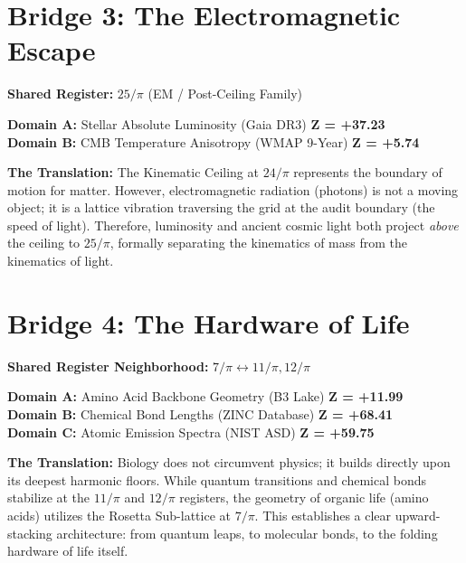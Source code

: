 \documentclass[12pt,oneside]{book}
\begin{document}
\section*{Bridge 3: The Electromagnetic Escape}
\begin{tcolorbox}[colback=orange!5, colframe=orange!50!black, title=BRIDGE: Observational Astronomy $\leftrightarrow$ Early Universe Cosmology]
\textbf{Shared Register:} $25/\pi$ (EM / Post-Ceiling Family)

\textbf{Domain A:} Stellar Absolute Luminosity (Gaia DR3) \hfill \textbf{Z = +37.23} \\
\textbf{Domain B:} CMB Temperature Anisotropy (WMAP 9-Year) \hfill \textbf{Z = +5.74}

\textbf{The Translation:} The Kinematic Ceiling at $24/\pi$ represents the boundary of motion for matter. However, electromagnetic radiation (photons) is not a moving object; it is a lattice vibration traversing the grid at the audit boundary (the speed of light). Therefore, luminosity and ancient cosmic light both project \textit{above} the ceiling to $25/\pi$, formally separating the kinematics of mass from the kinematics of light.
\end{tcolorbox}

\section*{Bridge 4: The Hardware of Life}
\begin{tcolorbox}[colback=green!5, colframe=green!50!black, title=BRIDGE: Molecular Biology $\leftrightarrow$ Quantum Chemistry]
\textbf{Shared Register Neighborhood:} $7/\pi \leftrightarrow 11/\pi, 12/\pi$

\textbf{Domain A:} Amino Acid Backbone Geometry (B3 Lake) \hfill \textbf{Z = +11.99} \\
\textbf{Domain B:} Chemical Bond Lengths (ZINC Database) \hfill \textbf{Z = +68.41} \\
\textbf{Domain C:} Atomic Emission Spectra (NIST ASD) \hfill \textbf{Z = +59.75}

\textbf{The Translation:} Biology does not circumvent physics; it builds directly upon its deepest harmonic floors. While quantum transitions and chemical bonds stabilize at the $11/\pi$ and $12/\pi$ registers, the geometry of organic life (amino acids) utilizes the Rosetta Sub-lattice at $7/\pi$. This establishes a clear upward-stacking architecture: from quantum leaps, to molecular bonds, to the folding hardware of life itself.
\end{tcolorbox}
\end{document}
